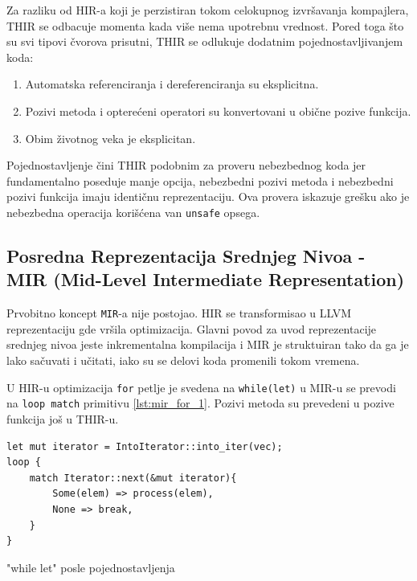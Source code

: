 \documentclass[11pt]{article}
\begin{document}
Za razliku od HIR-a koji je perzistiran tokom celokupnog izvršavanja kompajlera, THIR se odbacuje momenta
kada više nema upotrebnu vrednost. Pored toga što su svi tipovi čvorova prisutni, THIR se odlukuje dodatnim 
pojednostavljivanjem koda:
\begin{enumerate}
    \item Automatska referenciranja i dereferenciranja su eksplicitna.
    \item Pozivi metoda i opterećeni operatori su konvertovani u obične pozive funkcija. 
    \item Obim životnog veka je eksplicitan.
\end{enumerate}

Pojednostavljenje čini THIR podobnim za proveru nebezbednog koda jer fundamentalno poseduje manje opcija, 
nebezbedni pozivi metoda i nebezbedni pozivi funkcija imaju identičnu reprezentaciju. Ova provera 
iskazuje grešku ako je nebezbedna operacija korišćena van \verb|unsafe| opsega.


\newpage
\subsection{Posredna Reprezentacija Srednjeg Nivoa - MIR (Mid-Level Intermediate Representation)}

Prvobitno koncept \verb|MIR|-a nije postojao. HIR se transformisao u LLVM reprezentaciju gde 
vršila optimizacija. Glavni povod za uvod reprezentacije srednjeg nivoa 
jeste inkrementalna kompilacija i MIR je struktuiran tako da ga je lako sačuvati i učitati, iako su se delovi
koda promenili tokom vremena.

U HIR-u optimizacija \verb|for| petlje je svedena na \verb|while(let)| u MIR-u se prevodi na \verb|loop match| 
primitivu \ref{lst:mir_for_1}.  Pozivi metoda su prevedeni u pozive funkcija još u THIR-u.

\begin{listing}[H]
\begin{verbatim}
let mut iterator = IntoIterator::into_iter(vec);
loop {
    match Iterator::next(&mut iterator){
        Some(elem) => process(elem),
        None => break,
    }
}
\end{verbatim}
\caption{"while let" posle pojednostavljenja}
\label{lst:mir_for_1}
\end{listing}
\end{document}
